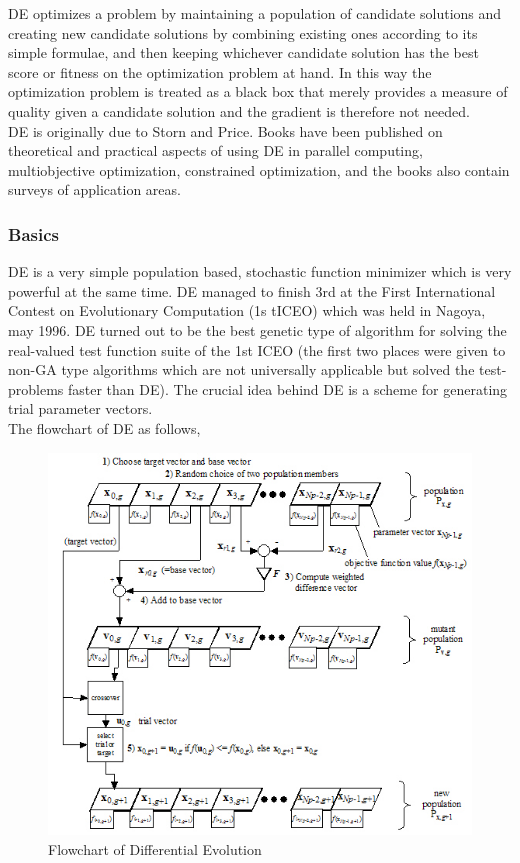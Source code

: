 \documentclass[11pt, a4paper]{report}
\begin{document}
DE optimizes a problem by maintaining a population of candidate solutions and creating new candidate solutions by combining existing ones according to its simple formulae, and then keeping whichever candidate solution has the best score or fitness on the optimization problem at hand. In this way the optimization problem is treated as a black box that merely provides a measure of quality given a candidate solution and the gradient is therefore not needed. \\

DE is originally due to Storn and Price. Books have been published on theoretical and practical aspects of using DE in parallel computing, multiobjective optimization, constrained optimization, and the books also contain surveys of application areas. \cite{wiki:de}

\subsubsection{Basics}
DE is a very simple population based, stochastic function minimizer which is very powerful at the same time. DE managed to finish 3rd at the First International Contest on Evolutionary Computation (1s tICEO) which was held in Nagoya, may 1996. DE turned out to be the best genetic type of algorithm for solving the real-valued test function suite of the 1st ICEO (the first two places were given to non-GA type algorithms which are not universally applicable but solved the test-problems faster than DE). The crucial idea behind DE is a scheme for generating trial parameter vectors. \\

\newpage 
The flowchart of DE as follows,
\vspace{30px}
	\begin{figure}[!bth]
	\center
	\includegraphics[scale=1.2]{images/de2.jpg}
	\caption[Flowchart of Differential Evolution]{Flowchart of Differential Evolution \cite{diag:de}}
	\label{fig:deFlowchart}
	\end{figure}
\end{document}
